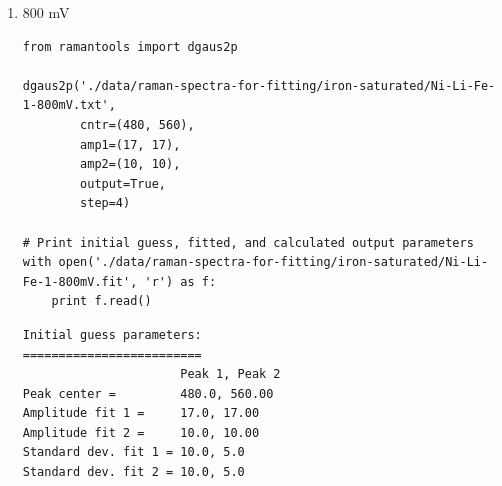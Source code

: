 \documentclass[journal=jpccck,manuscript=suppinfo,email=true]{achemso}
\begin{document}
\begin{enumerate}
\begin{enumerate}
\begin{enumerate}
\begin{verbatim}
dgaus2p('./data/raman-spectra-for-fitting/iron-saturated/Ni-Li-Fe-1-700mV.txt',
        cntr=(480, 560),
        amp1=(15, 15),
        amp2=(10, 10),
        output=True,
        step=4)

# Print initial guess, fitted, and calculated output parameters
with open('./data/raman-spectra-for-fitting/iron-saturated/Ni-Li-Fe-1-700mV.fit', 'r') as f:
    print f.read()
\end{verbatim}

\begin{verbatim}
Initial guess parameters:
=========================
                      Peak 1, Peak 2
Peak center =         480.0, 560.00
Amplitude fit 1 =     15.0, 15.00
Amplitude fit 2 =     10.0, 10.00
Standard dev. fit 1 = 10.0, 5.0
Standard dev. fit 2 = 10.0, 5.0

Baseline parameters:
=========================
Slope =               -0.02
Intercept =           36.39

Fitted parameters:
=========================
                      Peak 1, Peak 2
Peak center =         479.10, 559.01
Amplitude fit 1 =     7.68, 22.44
Amplitude fit 2 =     8.17, 7.77
Standard dev. fit 1 = 34.07, 9.41
Standard dev. fit 2 = 27.62, 7.06

Calculation output:
========================
Mean peak 1 =         479.1 $\pm$ 0.27
Mean peak 2 =         559.0 $\pm$ 0.59
Height peak 1 =       55.6 $\pm$ 0.45
Height peak 2 =       39.6 $\pm$ 0.51
Area peak 1 =         1675.6
Area peak 2 =         994.7
\end{verbatim}

\item 800 mV
\label{sec-4-2-0-1-1-3}
\begin{verbatim}
from ramantools import dgaus2p

dgaus2p('./data/raman-spectra-for-fitting/iron-saturated/Ni-Li-Fe-1-800mV.txt',
        cntr=(480, 560),
        amp1=(17, 17),
        amp2=(10, 10),
        output=True,
        step=4)

# Print initial guess, fitted, and calculated output parameters
with open('./data/raman-spectra-for-fitting/iron-saturated/Ni-Li-Fe-1-800mV.fit', 'r') as f:
    print f.read()
\end{verbatim}

\begin{verbatim}
Initial guess parameters:
=========================
                      Peak 1, Peak 2
Peak center =         480.0, 560.00
Amplitude fit 1 =     17.0, 17.00
Amplitude fit 2 =     10.0, 10.00
Standard dev. fit 1 = 10.0, 5.0
Standard dev. fit 2 = 10.0, 5.0


\end{verbatim}
\end{enumerate}
\end{enumerate}
\end{enumerate}
\end{document}
